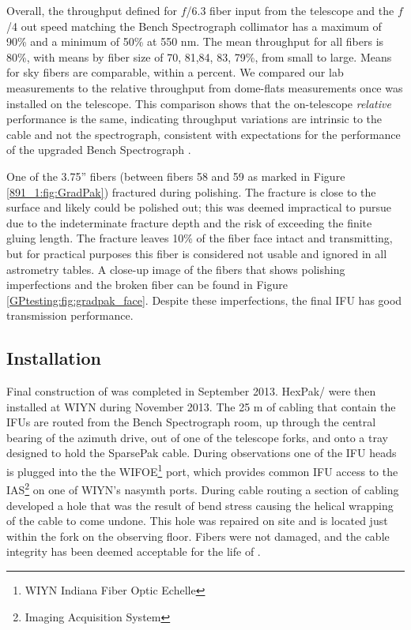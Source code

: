 Overall, the throughput defined for $f$/6.3 fiber input from the
telescope and the $f$/4 out speed matching the Bench Spectrograph
collimator has a maximum of 90\% and a minimum of 50\% at 550 nm. The
mean throughput for all fibers is 80\%, with means by fiber size of
70, 81,84, 83, 79\%, from small to large. Means for sky fibers are
comparable, within a percent. We compared our lab measurements to the
relative throughput from dome-flats measurements once \GP was
installed on the telescope. This comparison shows that the
on-telescope {\it relative} performance is the same, indicating
throughput variations are intrinsic to the cable and not the
spectrograph, consistent with expectations for the performance of the
upgraded Bench Spectrograph \citep{Bershady08,Knezek10}.

One of the 3.75'' fibers (between fibers 58 and 59 as marked in Figure
\ref{891_1:fig:GradPak}) fractured during polishing. The fracture is
close to the surface and likely could be polished out; this was deemed
impractical to pursue due to the indeterminate fracture depth and the
risk of exceeding the finite gluing length. The fracture leaves 10\%
of the fiber face intact and transmitting, but for practical purposes
this fiber is considered not usable and ignored in all astrometry
tables.  A close-up image of the \GP fibers that shows polishing
imperfections and the broken fiber can be found in Figure
\ref{GPtesting:fig:gradpak_face}.  Despite these imperfections, the
final IFU has good transmission performance.

\subsection{Installation}
\label{891_1:sec:install}

Final construction of \GP was completed in September 2013.  HexPak/\GP
were then installed at WIYN during November 2013. The 25 m of cabling
that contain the IFUs are routed from the Bench Spectrograph room, up
through the central bearing of the azimuth drive, out of one of the
telescope forks, and onto a tray designed to hold the SparsePak
cable. During observations one of the IFU heads is plugged into the
the WIFOE\footnote{WIYN Indiana Fiber Optic Echelle} port, which
provides common IFU access to the IAS\footnote{Imaging Acquisition
  System} on one of WIYN's nasymth ports. During cable routing a
section of cabling developed a hole that was the result of bend stress
causing the helical wrapping of the cable to come undone. This hole
was repaired on site and is located just within the fork on the
observing floor. Fibers were not damaged, and the cable integrity has
been deemed acceptable for the life of \GP.

